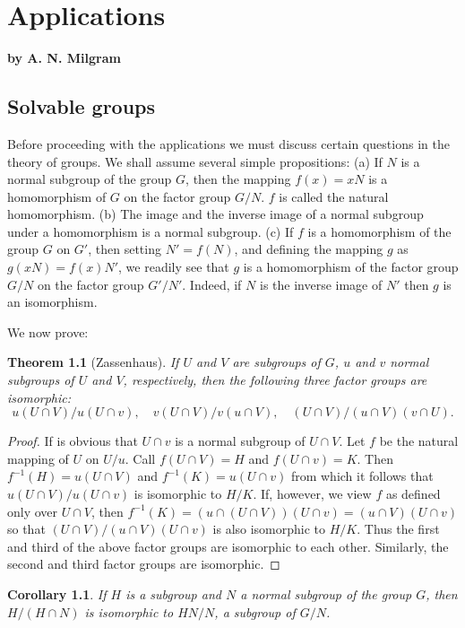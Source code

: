\documentclass[10pt,leqno,a5paper]{book}
\makeatletter
\newcommand{\chapterauthor}[1]{%
  {\parindent0pt\vspace*{-35pt}%
  \linespread{1.1}\center\bfseries by #1%
  \par\nobreak\vspace*{35pt}}
  \@afterheading%
}
\newtheorem{theo}{Theorem}
\newtheorem{coro}{Corollary}
\theoremstyle{definition}
\let\hon\chapter
\let\htw\section
\makeatother
\begin{document}
\hon{Applications}
\chapterauthor{A. N. Milgram}
\thispagestyle{empty}

\setcounter{theo}{0}
\setcounter{coro}{0}


\htw{Solvable groups}

Before proceeding with the applications we must discuss certain questions in the theory of groups.
We shall assume several simple propositions:
(a) If $N$ is a normal subgroup of the group $G$, then the mapping $f(x) = xN$ is a homomorphism of $G$ on the factor group $G/N$.
$f$ is called the natural homomorphism.
(b) The image and the inverse image of a normal subgroup under a homomorphism is a normal subgroup.
(c) If $f$ is a homomorphism of the group $G$ on $G'$, then setting $N' = f(N)$, and defining the mapping $g$ as $g(xN) = f(x) N'$, we readily see that $g$ is a homomorphism of the factor group $G/N$ on the factor group $G'/N'$.
Indeed, if $N$ is the inverse image of $N'$ then $g$ is an isomorphism.

We now prove:


\begin{theo}[Zassenhaus]
\label{theo:III.1}
If $U$ and $V$ are subgroups of $G$, $u$ and $v$ normal subgroups of $U$ and $V$, respectively, then the following three factor groups are isomorphic:
\[
u( U \cap V) / u(U \cap v),
\quad
v(U \cap V) / v(u \cap V),
\quad
(U \cap V)/ (u \cap V) (v \cap U).
\]
\end{theo}


\begin{proof}
If is obvious that $U \cap v$ is a normal subgroup of $U \cap V$.
Let $f$ be the natural mapping of $U$ on $U / u$.
Call $f(U \cap V) = H$ and $f(U \cap v) = K$.
Then $f^{-1}(H) = u(U \cap V)$ and $f^{-1}(K) = u(U \cap v)$ from which it follows that $u(U \cap V) / u(U \cap v)$ is isomorphic to $H / K$.
If, however, we view $f$ as defined only over $U \cap V$, then $f^{-1}(K) = ( u \cap (U \cap V) ) (U \cap v) = (u \cap V)(U \cap v)$ so that $(U \cap V) / (u \cap V)(U \cap v)$ is also isomorphic to $H/K$.
Thus the first and third of the above factor groups are isomorphic to each other.
Similarly, the second and third factor groups are isomorphic.
\end{proof}


\begin{coro}
\label{coro:III.1}
If $H$ is a subgroup and $N$ a normal subgroup of the group $G$, then $H / (H \cap N)$ is isomorphic to $HN/N$, a subgroup of $G/N$.
\end{coro}
\end{document}
